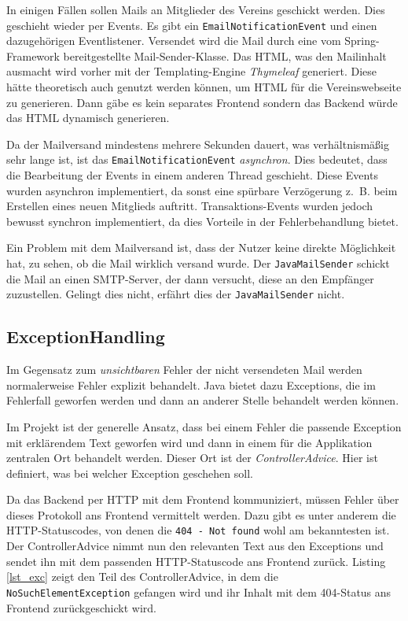 \documentclass[a4paper, 11pt]{article}
\begin{document}
In einigen Fällen sollen Mails an Mitglieder des Vereins geschickt werden. Dies
geschieht wieder per Events. Es gibt ein \lstinline{EmailNotificationEvent} und
einen dazugehörigen Eventlistener. Versendet wird die Mail durch eine vom
Spring-Framework bereitgestellte Mail-Sender-Klasse. Das HTML, was den
Mailinhalt ausmacht wird vorher mit der Templating-Engine \emph{Thymeleaf}
generiert. Diese hätte theoretisch auch genutzt werden können, um HTML für die
Vereinswebseite zu generieren. Dann gäbe es kein separates Frontend sondern das
Backend würde das HTML dynamisch generieren.

Da der Mailversand mindestens mehrere Sekunden dauert, was verhältnismäßig sehr
lange ist, ist das \lstinline{EmailNotificationEvent} \emph{asynchron}. Dies
bedeutet, dass die Bearbeitung der Events in einem anderen Thread geschieht.
Diese Events wurden asynchron implementiert, da sonst eine spürbare Verzögerung
z.~B. beim Erstellen eines neuen Mitglieds auftritt. Transaktions-Events wurden
jedoch bewusst synchron implementiert, da dies Vorteile in der Fehlerbehandlung
bietet.

Ein Problem mit dem Mailversand ist, dass der Nutzer keine direkte Möglichkeit
hat, zu sehen, ob die Mail wirklich versand wurde. Der
\lstinline{JavaMailSender} schickt die Mail an einen SMTP-Server, der dann
versucht, diese an den Empfänger zuzustellen. Gelingt dies nicht, erfährt dies
der \lstinline{JavaMailSender} nicht.

\subsection{ExceptionHandling}

Im Gegensatz zum \emph{unsichtbaren} Fehler der nicht versendeten Mail werden
normalerweise Fehler explizit behandelt. Java bietet dazu Exceptions, die im
Fehlerfall geworfen werden und dann an anderer Stelle behandelt werden können.

Im Projekt ist der generelle Ansatz, dass bei einem Fehler die passende
Exception mit erklärendem Text geworfen wird und dann in einem für die
Applikation zentralen Ort behandelt werden. Dieser Ort ist der
\emph{ControllerAdvice}. Hier ist definiert, was bei welcher Exception
geschehen soll. 

Da das Backend per HTTP mit dem Frontend kommuniziert, müssen Fehler über
dieses Protokoll ans Frontend vermittelt werden. Dazu gibt es unter anderem die
HTTP-Statuscodes, von denen die \lstinline{404 - Not found} wohl am
bekanntesten ist. Der ControllerAdvice nimmt nun den relevanten Text aus den
Exceptions und sendet ihn mit dem passenden HTTP-Statuscode ans Frontend
zurück. Listing \ref{lst_exc} zeigt den Teil des ControllerAdvice, in dem die
\lstinline{NoSuchElementException} gefangen wird und ihr Inhalt mit dem
404-Status ans Frontend zurückgeschickt wird.
\end{document}
